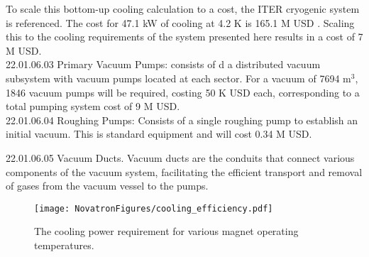 To scale this bottom-up cooling calculation to a cost, the ITER cryogenic system is referenced. The cost for 47.1 kW of cooling at 4.2 K is 165.1 M USD \cite{waganer2006design, serio2010challenges}. Scaling this to the cooling requirements of the system presented here results in a cost of 7 M USD. \\

22.01.06.03 Primary Vacuum Pumps: consists of d a distributed vacuum subsystem with vacuum pumps located at each sector. For a vacuum of 7694 m$^3$, 1846 vacuum pumps will be required, costing 50 K USD each, corresponding to a total pumping system cost of 9 M USD.\\

22.01.06.04 Roughing Pumps: Consists of a single roughing pump to establish an initial vacuum. This is standard equipment and will cost 0.34 M USD.

22.01.06.05 Vacuum Ducts. Vacuum ducts are the conduits that connect various components of the vacuum system, facilitating the efficient transport and removal of gases from the vacuum vessel to the pumps.

\begin{figure}[h]
    \centering
    \texttt{[image: NovatronFigures/cooling\_efficiency.pdf]}
    \caption{The cooling power requirement for various magnet operating temperatures.}
    \label{fig:cool_eff}
\end{figure}